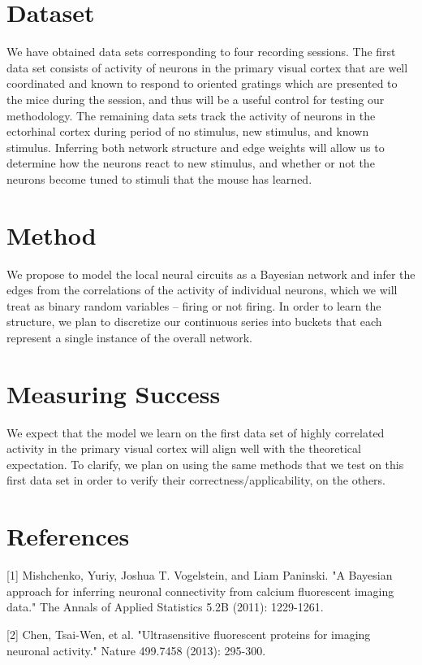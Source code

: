 \documentclass{article}
\begin{document}
\section*{Dataset}

We have obtained data sets corresponding to four recording sessions. The first 
data set consists of activity of neurons in the primary visual cortex that are 
well coordinated and known to respond to oriented gratings which are presented 
to the mice during the session, and thus will be a useful control for testing 
our methodology. The remaining data sets track the activity of neurons in the 
ectorhinal cortex during period of no stimulus, new stimulus, and known 
stimulus. Inferring both network structure and edge weights will allow us to 
determine how the neurons react to new stimulus, and whether or not the 
neurons become tuned to stimuli that the mouse has learned. \par

\section*{Method}

We propose to model the local neural circuits as a Bayesian network and infer 
the edges from the correlations of the activity of individual neurons, which 
we will treat as binary random variables – firing or not firing. In order to 
learn the structure, we plan to discretize our continuous series into buckets 
that each represent a single instance of the overall network. \par

\section*{Measuring Success}

We expect that the model we learn on the first data set of highly correlated 
activity in the primary visual cortex will align well with the theoretical 
expectation. To clarify, we plan on using the same methods that we test on 
this first data set in order to verify their correctness/applicability, on the 
others. \par

\section*{References}
[1] Mishchenko, Yuriy, Joshua T. Vogelstein, and Liam Paninski. "A Bayesian approach for inferring neuronal connectivity from calcium fluorescent imaging data." The Annals of Applied Statistics 5.2B (2011): 1229-1261.

[2] Chen, Tsai-Wen, et al. "Ultrasensitive fluorescent proteins for imaging neuronal activity." Nature 499.7458 (2013): 295-300.
\end{document}
